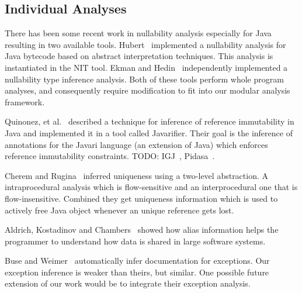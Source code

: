 \subsection{Individual Analyses}

There has been some recent work in nullability analysis especially for Java resulting in two available tools.  Hubert~\cite{NIT} implemented a nullability analysis for Java bytecode based on abstract interpretation techniques.  This analysis is instantiated in the {\sc NIT} tool.  Ekman and Hedin~\cite{NonNullTypeInference} independently implemented a nullability type inference analysis.  Both of these tools perform whole program analyses, and consequently require modification to fit into our modular analysis framework.

Quinonez, et al.~\cite{Javarifier} described a technique for inference of
reference immutability in Java and implemented it in a tool called {\sc
  Javarifier}. Their goal is the inference of annotations for the {\sc Javari}
language (an extension of Java) which enforces reference immutability
constraints. TODO: IGJ~\cite{IGJ}, Pidasa~\cite{Pidasa}.

Cherem and Rugina~\cite{UniquenessInference} inferred uniqueness using a two-level
abstraction. A intraprocedural analysis which is flow-sensitive and an interprocedural
one that is flow-insensitive. Combined they get uniqueness information
which is used to actively free Java object whenever an unique reference gets lost.

Aldrich, Kostadinov and Chambers~\cite{AliasJava} showed how alias information 
helps the programmer to understand how data is shared in large software systems.

Buse and Weimer~\cite{autodoc} automatically infer documentation for
exceptions.  Our exception inference is weaker than theirs, but similar.  One
possible future extension of our work would be to integrate their exception
analysis.
